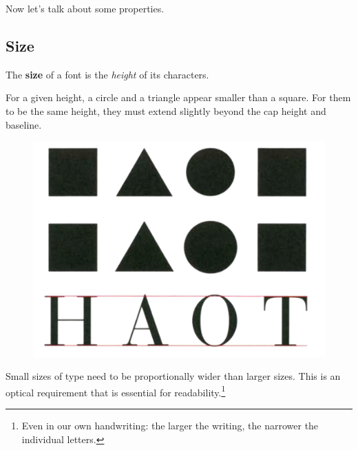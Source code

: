   Now let's talk about some properties. 

\subsection{Size} 

  \begin{definition}[Size]
    The \textbf{size} of a font is the \textit{height} of its characters. 
  \end{definition} 

  \begin{theorem}[Height]
    For a given height, a circle and a triangle appear smaller than a square. For them to be the same height, they must extend slightly beyond the cap height and baseline. 

    \begin{figure}[H]
      \centering 
      \includegraphics[scale=0.3]{img/size.png}
      \caption{} 
      \label{fig:size}
    \end{figure}
  \end{theorem} 

  \begin{theorem}[Width]
    Small sizes of type need to be proportionally wider than larger sizes. This is an optical requirement that is essential for readability.\footnote{Even in our own handwriting: the larger the writing, the narrower the individual letters. } 
  \end{theorem}


